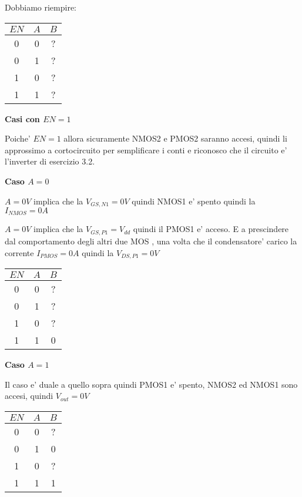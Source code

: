 \documentclass[\main/main.tex]{subfiles}
\begin{document}
Dobbiamo riempire:
\begin{center}
\begin{tabular}{ c  c | c}
  $EN$ & $A$ & $B$\\
  \hline				
  0 & 0 & ?\\	
  0 & 1 & ?\\	
  1 & 0 & ?\\ 	
  1 & 1 & ?\\ 
\end{tabular}
\end{center}

\textbf{Casi con $EN = 1$}

Poiche' $EN = 1$ allora sicuramente NMOS2 e PMOS2 saranno accesi, quindi li approssimo a cortocircuito per semplificare i conti e riconosco che il circuito e' l'inverter di esercizio 3.2.

\textbf{Caso $A = 0$}

$A = 0V$ implica che la $V_{GS,N1} = 0V$ quindi NMOS1 e' spento quindi la $I_{NMOS}  = 0A$

$A = 0V$ implica che la $V_{GS,P1} = V_{dd}$ quindi il PMOS1 e' acceso.
E a prescindere dal comportamento degli altri due MOS , una volta che il condensatore' carico la corrente $I_{PMOS} = 0A$ quindi la $V_{DS,P1} = 0V$
\begin{center}
\begin{tabular}{ c  c | c}
  $EN$ & $A$ & $B$\\
  \hline				
  0 & 0 & ?\\	
  0 & 1 & ?\\	
  1 & 0 & ?\\ 	
  1 & 1 & 0\\ 
\end{tabular}
\end{center}

\textbf{Caso  $A = 1$}

Il caso e' duale a quello sopra quindi PMOS1 e' spento, NMOS2 ed NMOS1 sono accesi, quindi $V_{out} = 0V$

\begin{center}
\begin{tabular}{ c  c | c}
  $EN$ & $A$ & $B$\\
  \hline				
  0 & 0 & ?\\	
  0 & 1 & 0\\	
  1 & 0 & ?\\ 	
  1 & 1 & 1\\ 
\end{tabular}
\end{center}
\end{document}
